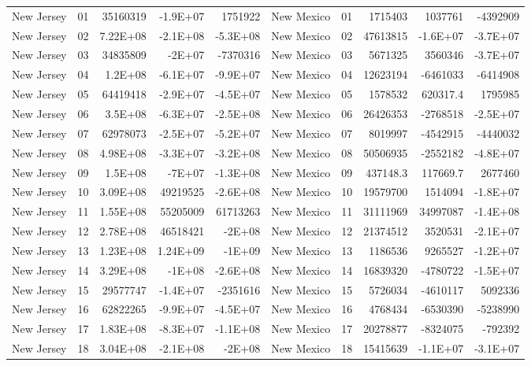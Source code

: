 \begin{landscape}
\begin{singlespace}
\begin{longtable}{lrrrr|lrrrr}
		New Jersey &  01  & 35160319 & -1.9E+07 & 1751922 & New Mexico &  01  & 1715403 & 1037761 & -4392909 \\
		New Jersey &  02  & 7.22E+08 & -2.1E+08 & -5.3E+08 & New Mexico &  02  & 47613815 & -1.6E+07 & -3.7E+07 \\
		New Jersey &  03  & 34835809 & -2E+07 & -7370316 & New Mexico &  03  & 5671325 & 3560346 & -3.7E+07 \\
		New Jersey &  04  & 1.2E+08 & -6.1E+07 & -9.9E+07 & New Mexico &  04  & 12623194 & -6461033 & -6414908 \\
		New Jersey &  05  & 64419418 & -2.9E+07 & -4.5E+07 & New Mexico &  05  & 1578532 & 620317.4 & 1795985 \\
		New Jersey &  06  & 3.5E+08 & -6.3E+07 & -2.5E+08 & New Mexico &  06  & 26426353 & -2768518 & -2.5E+07 \\
		New Jersey &  07  & 62978073 & -2.5E+07 & -5.2E+07 & New Mexico &  07  & 8019997 & -4542915 & -4440032 \\
		New Jersey &  08  & 4.98E+08 & -3.3E+07 & -3.2E+08 & New Mexico &  08  & 50506935 & -2552182 & -4.8E+07 \\
		New Jersey &  09  & 1.5E+08 & -7E+07 & -1.3E+08 & New Mexico &  09  & 437148.3 & 117669.7 & 2677460 \\
		New Jersey &  10 & 3.09E+08 & 49219525 & -2.6E+08 & New Mexico &  10 & 19579700 & 1514094 & -1.8E+07 \\
		New Jersey &  11 & 1.55E+08 & 55205009 & 61713263 & New Mexico &  11 & 31111969 & 34997087 & -1.4E+08 \\
		New Jersey &  12 & 2.78E+08 & 46518421 & -2E+08 & New Mexico &  12 & 21374512 & 3520531 & -2.1E+07 \\
		New Jersey &  13 & 1.23E+08 & 1.24E+09 & -1E+09 & New Mexico &  13 & 1186536 & 9265527 & -1.2E+07 \\
		New Jersey &  14 & 3.29E+08 & -1E+08 & -2.6E+08 & New Mexico &  14 & 16839320 & -4780722 & -1.5E+07 \\
		New Jersey &  15 & 29577747 & -1.4E+07 & -2351616 & New Mexico &  15 & 5726034 & -4610117 & 5092336 \\
		New Jersey &  16 & 62822265 & -9.9E+07 & -4.5E+07 & New Mexico &  16 & 4768434 & -6530390 & -5238990 \\
		New Jersey &  17 & 1.83E+08 & -8.3E+07 & -1.1E+08 & New Mexico &  17 & 20278877 & -8324075 & -792392 \\
		New Jersey &  18 & 3.04E+08 & -2.1E+08 & -2E+08 & New Mexico &  18 & 15415639 & -1.1E+07 & -3.1E+07 \\

\end{longtable}
\end{singlespace}
\end{landscape}
